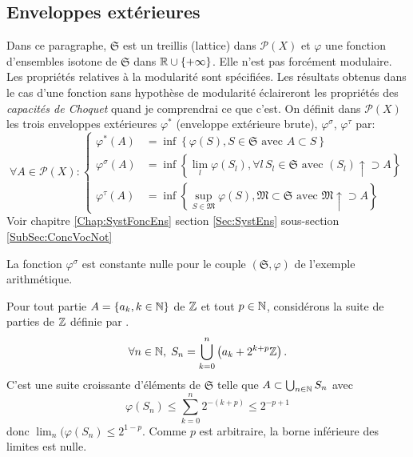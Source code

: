 \subsection{Enveloppes extérieures}
Dans ce paragraphe, $\mathfrak{S}$ est un treillis (lattice) dans $\mathcal{P}(X)$ et $\varphi$ une fonction d'ensembles isotone de $\mathfrak{S}$ dans $\mathbb{R} \cup \left\lbrace +\infty \right\rbrace$. Elle n'est pas forcément modulaire. Les propriétés relatives à la modularité sont spécifiées. Les résultats obtenus dans le cas d'une fonction sans hypothèse de modularité éclaireront les propriétés des \emph{capacités de Choquet} quand je comprendrai ce que c'est.\newline
On définit dans $\mathcal{P}(X)$ les trois enveloppes extérieures $\varphi^*$ (enveloppe extérieure brute), $\varphi^\sigma$, $\varphi^\tau$ par:
\begin{displaymath}
 \forall A \in  \mathcal{P}(X):
 \left\lbrace
 \begin{aligned}
    \varphi^*(A) &= \inf \left\lbrace \varphi(S), S \in \mathfrak{S} \text{ avec } A \subset S \right\rbrace \\
    \varphi^\sigma(A) &= \inf \left\lbrace \lim_{l}  \varphi(S_l), \forall l \, S_l\in \mathfrak{S} \text{ avec } (S_l) \uparrow \supset A \right\rbrace \\
    \varphi^\tau(A) &= \inf \left\lbrace \sup_{S \in \mathfrak{M}} \varphi(S), \mathfrak{M} \subset \mathfrak{S} \text{ avec } \mathfrak{M}\uparrow \supset A\right\rbrace
 \end{aligned}
 \right.
\end{displaymath}
Voir chapitre \ref{Chap:SystFoncEns} section \ref{Sec:SystEns} sous-section \ref{SubSec:ConcVocNot}
\begin{prop}
 La fonction $\varphi^\sigma$ est constante nulle pour le couple $(\mathfrak{S}, \varphi)$ de l'exemple arithmétique.
\end{prop}
\begin{demo}
 Pour tout partie $A = \left\lbrace a_k , k \in \mathbb{N}\right\rbrace$ de $\mathbb{Z}$ et tout $p\in \mathbb{N}$, considérons la suite de parties de $\mathbb{Z}$ définie par .
 \begin{displaymath}
  \forall n \in \mathbb{N}, \; S_n = \bigcup_{k =0}^n \left(a_k + 2^{k+p} \mathbb{Z}\right) .
 \end{displaymath}
 C'est une suite croissante d'éléments de $\mathfrak{S}$ telle que $A \subset \bigcup_{n\in \mathbb{N}}S_n$ avec
 \begin{displaymath}
  \varphi(S_n) \leq \sum_{k=0}^n 2^{-(k+p)} \leq 2^{-p + 1}
 \end{displaymath}
donc  $\lim_n (\varphi(S_n) \leq 2^{1-p}$. Comme $p$ est arbitraire, la borne inférieure des limites est nulle.
\end{demo}

